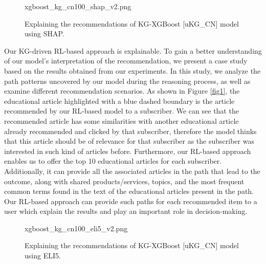 \documentclass[11pt]{article}
\begin{document}
\begin{figure}
{xgboost_kg_cn100_shap_v2.png}
\caption{Explaining the recommendations of KG-XGBoost [uKG\_CN] model using SHAP.}
\label{fig_xgboost_kg_cn100_shap}
\end{figure}





Our KG-driven RL-based approach is explainable. To gain a better understanding of our model's interpretation of the recommendation, we present a case study based on the results obtained from our experiments. In this study, we analyze the path patterns uncovered by our model during the reasoning process, as well as examine different recommendation scenarios. As shown in Figure \ref{fig1}, the educational article highlighted with a blue dashed boundary is the article recommended by our RL-based model to a subscriber. We can see that the recommended article has some similarities with another educational article already recommended and clicked by that subscriber, therefore the model thinks that this article should be of relevance for that subscriber as the subscriber was interested in such kind of articles before. Furthermore, our RL-based approach enables us to offer the top 10 educational articles for each subscriber. Additionally, it can provide all the associated articles in the path that lead to the outcome, along with shared products/services, topics, and the most frequent common terms found in the text of the educational articles present in the path. Our RL-based approach can provide such paths for each recommended item to a user which explain the results and play an important role in decision-making. 

\begin{figure}
{xgboost_kg_cn100_eli5_v2.png}
\caption{Explaining the recommendations of KG-XGBoost [uKG\_CN] model using ELI5.}
\label{fig_xgboost_kg_cn100_eli5}
\end{figure}
\end{document}
